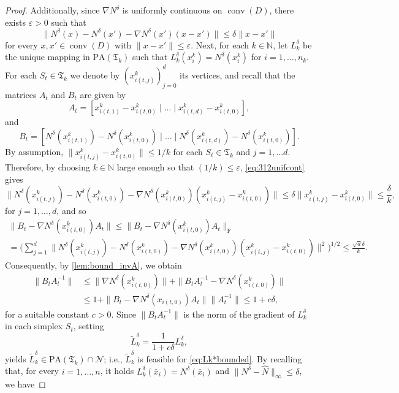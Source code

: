 \documentclass[10pt,a4paper]{amsart}
\newcommand{\N}{\mathcal{N}}
\newcommand{\conv}{\operatorname{conv}}
\begin{document}
\begin{proof}
Additionally, since $\nabla N^\delta$ is uniformly continuous on $\conv (D)$, there exists $\varepsilon>0$ such that
\begin{equation}\label{eq:312unifcont}
\|N^\delta(x)-N^\delta(x')-\nabla N^\delta(x')(x-x')\|\leq \delta\|x-x'\|
\end{equation}
for every $x, x'\in\conv(D)$ with $\|x-x'\|\leq \varepsilon$. Next, for each $k\in\mathbb{N}$, let  $L_k^\delta$ be the unique mapping in $\mathrm{PA}(\mathfrak{T}_k)$ such that $L_k^\delta(x_i^k)=N^\delta(x^k_i)$ for $i=1,\ldots, n_k$. For each $S_t\in\mathfrak{T}_k$ we denote by $(x^k_{i(t,j)})_{j=0}^d$ its vertices, and recall that the matrices $A_t$ and $B_t$ are given by
$$
A_t=[x^k_{i(t,1)}-x^k_{i(t,0)}\mid\dots \mid x^k_{i(t,d)}-x^k_{i(t,0)}],
$$
and 
$$
B_t=[N^\delta(x^k_{i(t,1)})-N^\delta(x^k_{i(t,0)})\mid\ldots \mid N^\delta(x^k_{i(t,d)})-N^\delta(x^k_{i(t,0)})].
$$
By assumption, $\|x^k_{i(t,j)}-x^k_{i(t,0)}\|\leq 1/k$ for each $S_t\in\mathfrak{T}_k$ and $j=1,\dots d$. Therefore, by choosing $k\in\mathbb{N}$ large enough so that $(1/k)\leq\varepsilon$, \cref{eq:312unifcont} gives
\begin{equation*}
\|N^\delta(x^k_{i(t,j)})-N^\delta(x^k_{i(t,0)})-\nabla N^\delta(x^k_{i(t,0)})(x^k_{i(t,j)}-x^k_{i(t,0)})\|\leq \delta\|x^k_{i(t,j)}-x^k_{i(t,0)}\| \leq \frac{\delta}{k},
\end{equation*}
for $j=1,\ldots, d$, and so
\begin{multline*}
\|B_t-\nabla N^\delta(x^k_{i(t,0)})A_t\| \leq 
\|B_t-\nabla N^\delta(x^k_{i(t,0)})A_t\|_{\mathrm{F}} \\
= \Biggl( \sum_{j=1}^d \| N^\delta(x^k_{i(t,j)})-N^\delta(x^k_{i(t,0)})-\nabla N^\delta(x^k_{i(t,0)})(x^k_{i(t,j)}-x^k_{i(t,0)})  \|^2 \Biggr)^{1/2} \leq
\frac{\sqrt{d}\delta}{k}.    
\end{multline*}
Consequently, by \cref{lem:bound_invA}, we obtain
$$
\begin{aligned}
\|B_tA_t^{-1}\|&\leq \|\nabla N^\delta(x^k_{i(t,0)})\|+\|B_tA_t^{-1}- \nabla N^\delta(x^k_{i(t,0)})\|\\
&\leq 1+ \|B_t - \nabla N^\delta(x_{i(t,0)}) A_t \| \| A_t^{-1} \| \leq 1+c\delta,
\end{aligned}
$$
for a suitable constant $c>0$. Since $\|B_tA_t^{-1}\|$ is
the norm of the gradient of $L_k^\delta$ in each simplex $S_t$, setting
$$
\widetilde{L}^\delta_k=\frac{1}{1+c\delta}L^\delta_k,
$$
yields $\widetilde{L}^\delta_k\in\mathrm{PA}(\mathfrak{T}_k)\cap \N$; i.e., $\widetilde{L}^\delta_k$ is feasible for \cref{eq:Lk*bounded}. By recalling that, for every $i=1,\ldots, n$, it holds $L^\delta_k(\bar x_i)=N^\delta(\bar x_i)$ and $\|N^\delta-\widehat{N}\|_\infty\leq \delta$, we have

\end{proof}
\end{document}

